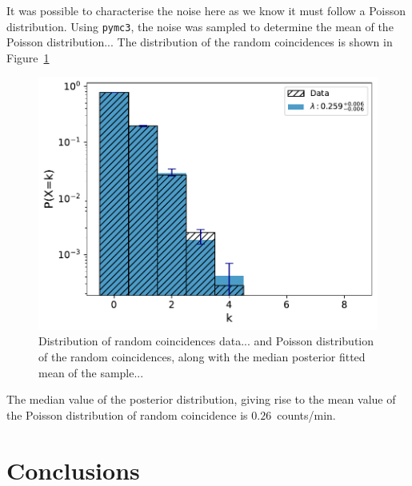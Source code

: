 It was possible to characterise the noise here as we know it must follow a Poisson distribution. Using \verb|pymc3|, the noise was sampled to determine the mean of the Poisson distribution... The distribution of the random coincidences is shown in Figure~\ref{fig:random_coinciences_dist}

\begin{figure}[ht!]
	\centering
	\includegraphics[width=0.6\columnwidth]{random_noise_fitted_poisson.pdf}
	\caption{Distribution of random coincidences data... and Poisson distribution of the random coincidences, along with the median posterior fitted mean of the sample...}
	\label{fig:random_coinciences_dist}
\end{figure}

The median value of the posterior distribution, giving rise to the mean value of the Poisson distribution of random coincidence is $0.26$~counts/min.







\section{Conclusions}\label{sec:HS_14008_conclusion}
